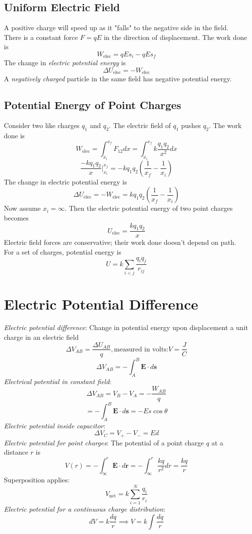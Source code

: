 \subsection{Uniform Electric Field}
A positive charge will speed up as it "falls" to the negative side in the field.\\
There is a constant force $F=qE$ in the direction of displacement. The work done is
$$W_{\text{elec}}=qEs_i-qEs_f$$
The change in \emph{electric potential energy} is
$$\Delta U_{\text{elec}}=-W_{\text{elec}}$$
A \emph{negatively charged} particle in the same field has negative potential energy.
\subsection{Potential Energy of Point Charges}
Consider two like charges $q_1$ and $q_2$. The electric field of $q_1$ pushes $q_2$. The work done is
$$W_{\text{elec}}=\int_{x_i}^{x_f}F_{12}dx=\int_{x_i}^{x_f}k\frac{q_1q_2}{x^2}dx$$
$$\frac{-kq_1q_2}{x}\vert_{x_i}^{x_f}=-kq_1q_2(\frac{1}{x_f}-\frac{1}{x_i})$$
The change in electric potential energy is
$$\Delta U_{\text{elec}}=-W_{\text{elec}}=kq_1q_2(\frac{1}{x_f}-\frac{1}{x_i})$$
Now assume $x_i=\infty$. Then the electric potential energy of two point charges becomes
$$U_{\text{elec}}=\frac{kq_1q_2}{x}$$
Electric field forces are conservative; their work done doesn't depend on path.\\
For a set of charges, potential energy is
$$U=k\sum_{i<j}\frac{q_iq_j}{r_{ij}}$$
\section{Electric Potential Difference}
\emph{Electric potential difference}: Change in potential energy upon 
displacement a unit charge in an electric field
$$\Delta V_{AB}=\frac{\Delta U_{AB}}{q}, \text{measured in volts:} V=\frac{J}{C}$$
$$\Delta V_{AB} = - \int_A^B\mathbf{E}\cdot d\mathbf{s}$$
\emph{Electrical potential in constant field}:
$$\Delta V_{AB}=V_B-V_A=-\frac{W_{AB}}{q}$$
$$=-\int_A^B\mathbf{E}\cdot d\mathbf{s}=-Es\cos{\theta}$$
\emph{Electric potential inside capacitor}:
$$\Delta V_C = V_+ - V_- = Ed$$
\emph{Electric potential for point charges}: The potential of a point charge $q$ at a distance $r$ is
$$V(r)=-\int_\infty^r\mathbf{E}\cdot d\mathbf{r} = -\int_\infty^r\frac{kq}{r^2}dr=\frac{kq}{r}$$
Superposition applies:
$$V_{\text{net}}=k\sum_{i=1}^N\frac{q_i}{r_i}$$
\emph{Electric potential for a continuous charge distribution}:
$$dV=k\frac{dq}{r}\implies V=k\int\frac{dq}{r}$$

